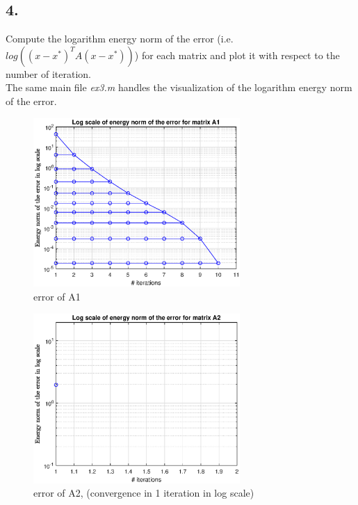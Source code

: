 \documentclass[unicode,11pt,a4paper,oneside,numbers=endperiod,openany]{scrartcl}
\begin{document}
\subsection*{4.}
Compute the logarithm energy norm of the error (i.e. $log((x - x^*)^T A(x - x^*))$)
for each matrix and plot it with respect to the number of iteration.\\

The same main file \textit{ex3.m} handles the visualization of the logarithm energy norm
of the error.

\begin{figure}[htbp]
\centering
\caption{error of A1}
\includegraphics[width=0.7\textwidth, trim={0cm 0cm 0cm 0cm}]{./figures/ex3-a1.eps}
\end{figure}

\begin{figure}[htbp]
\centering
\caption{error of A2, (convergence in 1 iteration in log scale)}
\includegraphics[width=0.7\textwidth, trim={0cm 0cm 0cm 0cm}]{./figures/ex3-a2.eps}
\end{figure}
\end{document}
